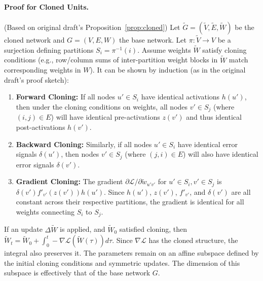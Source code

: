 \documentclass{article}
\newcommand{\Loss}{\mathcal{L}}
\begin{document}
\paragraph{Proof for Cloned Units.}
(Based on original draft's Proposition~\ref{prop:cloned})
Let $\widetilde{G}=(\widetilde V,\widetilde E,\widetilde W)$ be the cloned network and $G=(V,E,W)$ the base network. Let $\pi: \widetilde{V} \to V$ be a surjection defining partitions $S_i = \pi^{-1}(i)$. Assume weights $\widetilde{W}$ satisfy cloning conditions (e.g., row/column sums of inter-partition weight blocks in $\widetilde{W}$ match corresponding weights in $W$).
It can be shown by induction (as in the original draft's proof sketch):
\begin{enumerate}
    \item \textbf{Forward Cloning:} If all nodes $u' \in S_i$ have identical activations $h(u')$, then under the cloning conditions on weights, all nodes $v' \in S_j$ (where $(i,j) \in E$) will have identical pre-activations $z(v')$ and thus identical post-activations $h(v')$.
    \item \textbf{Backward Cloning:} Similarly, if all nodes $u' \in S_i$ have identical error signals $\delta(u')$, then nodes $v' \in S_j$ (where $(j,i) \in E$) will also have identical error signals $\delta(v')$.
    \item \textbf{Gradient Cloning:} The gradient $\partial\Loss/\partial \widetilde{w}_{u'v'}$ for $u' \in S_i, v' \in S_j$ is $\delta(v') f'_{v'}(z(v')) h(u')$. Since $h(u')$, $z(v')$, $f'_{v'}$, and $\delta(v')$ are all constant across their respective partitions, the gradient is identical for all weights connecting $S_i$ to $S_j$.
\end{enumerate}
If an update $\Delta \widetilde{W}$ is applied, and $\widetilde{W}_0$ satisfied cloning, then $\widetilde{W}_t = \widetilde{W}_0 + \int_0^t -\nabla \Loss(\widetilde{W}(\tau)) d\tau$. Since $\nabla \Loss$ has the cloned structure, the integral also preserves it. The parameters remain on an affine subspace defined by the initial cloning conditions and symmetric updates. The dimension of this subspace is effectively that of the base network $G$.
\end{document}
